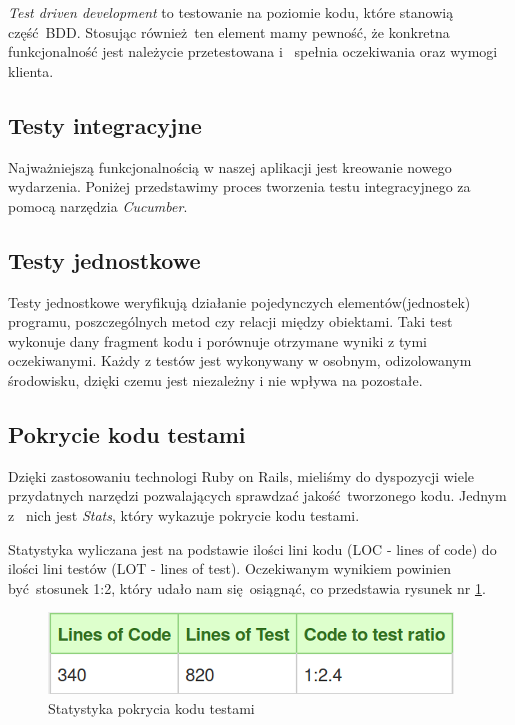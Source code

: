 \begin{itemize}
        \emph{Test driven development} to testowanie na poziomie kodu, które stanowią część BDD. Stosując również ten element mamy pewność, że konkretna funkcjonalność jest należycie przetestowana i~ spełnia oczekiwania oraz wymogi klienta.
    \end{itemize}

  \subsection{Testy integracyjne}
    Najważniejszą funkcjonalnością w naszej aplikacji jest kreowanie nowego wydarzenia. Poniżej przedstawimy proces tworzenia testu integracyjnego za pomocą narzędzia \emph{Cucumber}.

    
  \subsection{Testy jednostkowe}
    Testy jednostkowe weryfikują działanie pojedynczych elementów(jednostek) programu, poszczególnych metod czy relacji między obiektami. Taki test wykonuje dany fragment kodu i porównuje otrzymane wyniki z tymi oczekiwanymi. Każdy z testów jest wykonywany w osobnym, odizolowanym środowisku, dzięki czemu jest niezależny i nie wpływa na pozostałe.

    
  \clearpage
  \subsection{Pokrycie kodu testami}
    Dzięki zastosowaniu technologi Ruby on Rails, mieliśmy do dyspozycji wiele przydatnych narzędzi pozwalających sprawdzać jakość tworzonego kodu. Jednym z~ nich jest \emph{Stats}, który wykazuje pokrycie kodu testami.

    Statystyka wyliczana jest na podstawie ilości lini kodu (LOC - lines of code) do ilości lini testów (LOT - lines of test). Oczekiwanym wynikiem powinien być stosunek 1:2, który udało nam się osiągnąć, co przedstawia rysunek nr \ref{fig:stat}.
    \begin{figure}[h]
      \centering
      \includegraphics[scale=0.5]{images/loc_table.png}
      \caption{Statystyka pokrycia kodu testami}
      \label{fig:stat}
    \end{figure}


